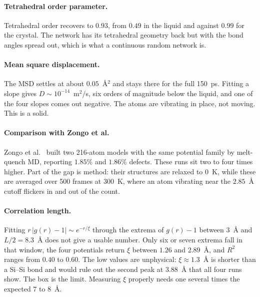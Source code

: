 \documentclass{article}
\begin{document}
\paragraph{Tetrahedral order parameter.}
Tetrahedral order recovers to $0.93$, from $0.49$ in the liquid and against $0.99$ for the crystal. The network has its tetrahedral geometry back but with the bond angles spread out, which is what a continuous random network is.

\paragraph{Mean square displacement.}
The MSD settles at about $0.05$~\AA$^2$ and stays there for the full 150~ps. Fitting a slope gives $D \sim 10^{-14}$~m$^2$/s, six orders of magnitude below the liquid, and one of the four slopes comes out negative. The atoms are vibrating in place, not moving. This is a solid.

\paragraph{Comparison with Zongo et al.}
Zongo et al.~\cite{zongo2025} built two 216-atom models with the same potential family by melt-quench MD, reporting $1.85\%$ and $1.86\%$ defects. These runs sit two to four times higher. Part of the gap is method: their structures are relaxed to $0$~K, while these are averaged over 500 frames at 300~K, where an atom vibrating near the $2.85$~\AA{} cutoff flickers in and out of the count.

\paragraph{Correlation length.}
Fitting $r\,|g(r)-1| \sim e^{-r/\xi}$ through the extrema of $g(r)-1$ between $3$~\AA{} and $L/2 = 8.3$~\AA{} does not give a usable number. Only six or seven extrema fall in that window, the four potentials return $\xi$ between $1.26$ and $2.89$~\AA, and $R^2$ ranges from $0.40$ to $0.60$. The low values are unphysical: $\xi \approx 1.3$~\AA{} is shorter than a Si--Si bond and would rule out the second peak at $3.88$~\AA{} that all four runs show. The box is the limit. Measuring $\xi$ properly needs one several times the expected $7$ to $8$~\AA.
\end{document}
